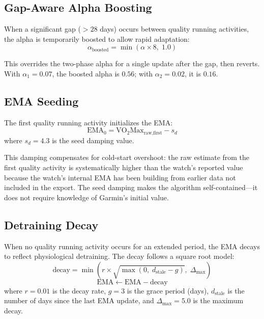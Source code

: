 \documentclass[11pt,a4paper]{article}
\begin{document}
\subsection{Gap-Aware Alpha Boosting}
\label{sec:gap-boost}

When a significant gap ($> 28$ days) occurs between quality running activities, the alpha is temporarily boosted to allow rapid adaptation:
\begin{equation}
\alpha_{\text{boosted}} = \min(\alpha \times 8,\; 1.0)
\label{eq:gap-boost}
\end{equation}

This overrides the two-phase alpha for a single update after the gap, then reverts.
With $\alpha_1 = 0.07$, the boosted alpha is $0.56$; with $\alpha_2 = 0.02$, it is $0.16$.


\subsection{EMA Seeding}
\label{sec:seeding}

The first quality running activity initializes the EMA:
\begin{equation}
\text{EMA}_0 = \text{VO}_2\text{Max}_{\text{raw,first}} - s_d
\label{eq:seed}
\end{equation}
where $s_d = 4.3$ is the seed damping value.

This damping compensates for cold-start overshoot: the raw estimate from the first quality activity is systematically higher than the watch's reported value because the watch's internal EMA has been building from earlier data not included in the export.
The seed damping makes the algorithm self-contained---it does not require knowledge of Garmin's initial value.


\subsection{Detraining Decay}
\label{sec:decay}

When no quality running activity occurs for an extended period, the EMA decays to reflect physiological detraining.
The decay follows a square root model:
\begin{equation}
\text{decay} = \min\!\left(r \times \sqrt{\max(0,\; d_{\text{stale}} - g)},\; \Delta_{\max}\right)
\label{eq:decay}
\end{equation}
\begin{equation}
\text{EMA} \leftarrow \text{EMA} - \text{decay}
\end{equation}
where $r = 0.01$ is the decay rate, $g = 3$ is the grace period (days), $d_{\text{stale}}$ is the number of days since the last EMA update, and $\Delta_{\max} = 5.0$ is the maximum decay.
\end{document}

